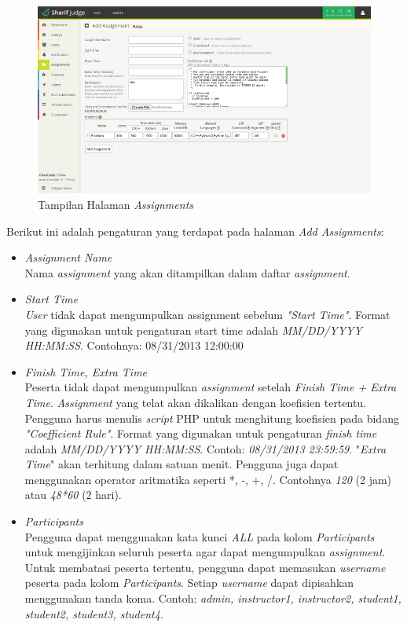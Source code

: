 \documentclass[a4paper,twoside]{article}
\begin{document}
\begin{enumerate}
		\begin{figure}[H]
			\centering  
			\includegraphics[width=1.0\textwidth]{add_assignment}  
			\caption[Tampilan Halaman \textit{Assignments}]{Tampilan Halaman \textit{Assignments}} 
			\label{fig:add_assignment} 
		\end{figure} 
		
		Berikut ini adalah pengaturan yang terdapat pada halaman \textit{Add Assignments}:
		\begin{itemize}
			\item \textit{Assignment Name} \\
			Nama \textit{assignment} yang akan ditampilkan dalam daftar \textit{assignment}.
			
			\item \textit{Start Time} \\
			\textit{User} tidak dapat mengumpulkan assignment sebelum \textit{"Start Time"}. Format yang digunakan untuk pengaturan start time adalah \textit{MM/DD/YYYY HH:MM:SS}. Contohnya: 08/31/2013 12:00:00
			
			\item \textit{Finish Time, Extra Time} \\
			Peserta tidak dapat mengumpulkan \textit{assignment} setelah \textit{Finish Time + Extra Time}. \textit{Assignment} yang telat akan dikalikan dengan koefisien tertentu. Pengguna harus menulis \textit{script} PHP untuk menghitung koefisien pada bidang \textit{"Coefficient Rule"}. Format yang digunakan untuk pengaturan \textit{finish time} adalah \textit{MM/DD/YYYY HH:MM:SS}. Contoh: \textit{08/31/2013 23:59:59}. "\textit{Extra Time}" akan terhitung dalam satuan menit. Pengguna juga dapat menggunakan operator aritmatika seperti *, -, +, /. Contohnya \textit{120} (2 jam) atau \textit{48*60} (2 hari).
			
			\item \textit{Participants} \\
			Pengguna dapat menggunakan kata kunci \textit{ALL} pada kolom \textit{Participants} untuk mengijinkan seluruh peserta agar dapat mengumpulkan \textit{assignment}. Untuk membatasi peserta tertentu, pengguna dapat memasukan \textit{username} peserta pada kolom \textit{Participants}. Setiap \textit{username} dapat dipisahkan menggunakan tanda koma. Contoh: \textit{admin, instructor1, instructor2, student1, student2, student3, student4}.
			

\end{itemize}
\end{enumerate}
\end{document}
